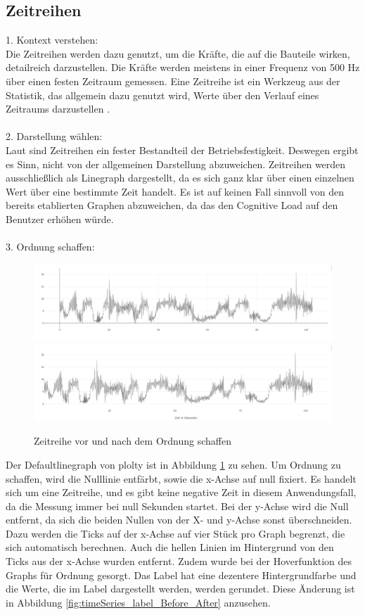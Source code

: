 \subsection{Zeitreihen}
\label{sec:timeseries}
1. Kontext verstehen: \\
Die Zeitreihen werden dazu genutzt, um die Kräfte, die auf die Bauteile wirken, detailreich darzustellen. Die Kräfte werden meistens in einer Frequenz von 500 Hz über einen festen Zeitraum gemessen. Eine Zeitreihe ist ein Werkzeug aus der Statistik, das allgemein dazu genutzt wird, Werte über den Verlauf eines Zeitraums darzustellen \cite{Billeter.1981}.
\\\\
2. Darstellung wählen:\\
Laut \cite{Gotz.2020} sind Zeitreihen ein fester Bestandteil der Betriebsfestigkeit. Deswegen ergibt es Sinn, nicht von der allgemeinen Darstellung abzuweichen. Zeitreihen werden ausschließlich als Linegraph dargestellt, da es sich ganz klar über einen einzelnen Wert über eine bestimmte Zeit handelt. Es ist auf keinen Fall sinnvoll von den bereits etablierten Graphen abzuweichen, da das den Cognitive Load auf den Benutzer erhöhen würde.
\\\\
3. Ordnung schaffen:\\
\begin{figure}[h!]
\centering
\includegraphics[width=\textwidth]{gfx/Zeitreihe_before.png} 
\includegraphics[width=\textwidth]{gfx/Zeitreihe_after.png}
\caption{Zeitreihe vor und nach dem Ordnung schaffen}
\label{fig:timeSeries_Before_After}
\end{figure}
\noindent
Der Defaultlinegraph von plolty ist in Abbildung \ref{fig:timeSeries_Before_After} zu sehen. Um Ordnung zu schaffen, wird die Nulllinie entfärbt, sowie die x-Achse auf null fixiert. Es handelt sich um eine Zeitreihe, und es gibt keine negative Zeit in diesem Anwendungsfall, da die Messung immer bei null Sekunden startet. Bei der y-Achse wird die Null entfernt, da sich die beiden Nullen von der X- und y-Achse sonst überschneiden. Dazu werden die Ticks auf der x-Achse auf vier Stück pro Graph begrenzt, die sich automatisch berechnen. Auch die hellen Linien im Hintergrund von den Ticks aus der x-Achse wurden entfernt. Zudem wurde bei der Hoverfunktion des Graphs für Ordnung gesorgt. Das Label hat eine dezentere Hintergrundfarbe und die Werte, die im Label dargestellt werden, werden gerundet. Diese Änderung ist in Abbildung \ref{fig:timeSeries_label_Before_After} anzusehen. 
